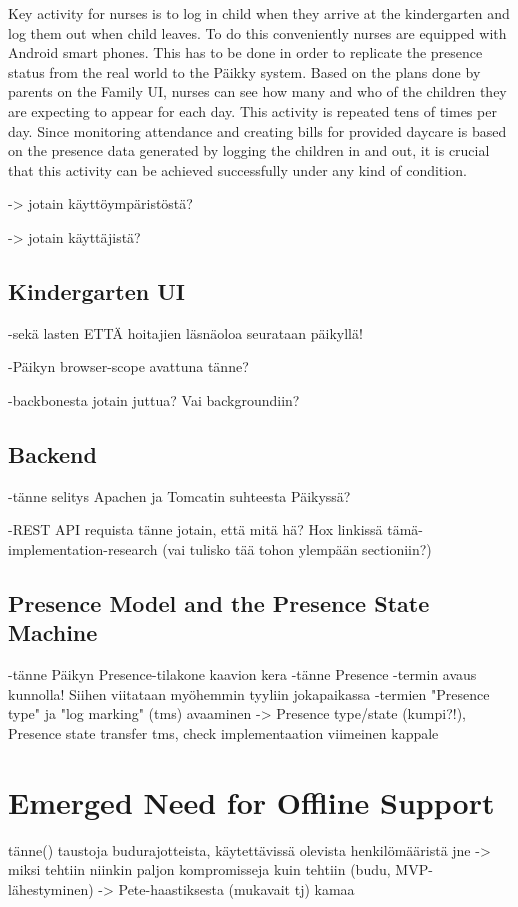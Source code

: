 Key activity for nurses is to log in child when they arrive at the kindergarten and log them out when child leaves. To do this conveniently nurses are equipped with Android smart phones. This has to be done in order to replicate the presence status from the real world to the Päikky system. Based on the plans done by parents on the Family UI, nurses can see how many and who of the children they are expecting to appear for each day. This activity is repeated tens of times per day. Since monitoring attendance and creating bills for provided daycare is based on the presence data generated by logging the children in and out, it is crucial that this activity can be achieved successfully under any kind of condition.

-> jotain käyttöympäristöstä?

-> jotain käyttäjistä?

\subsection{Kindergarten UI}
-sekä lasten ETTÄ hoitajien läsnäoloa seurataan päikyllä!

-Päikyn browser-scope avattuna tänne?

-backbonesta jotain juttua? Vai backgroundiin?




\subsection{Backend}
-tänne selitys Apachen ja Tomcatin suhteesta Päikyssä?

-REST API requista tänne jotain, että mitä hä? Hox linkissä tämä-implementation-research (vai tulisko tää tohon ylempään sectioniin?)




\subsection{Presence Model and the Presence State Machine}
-tänne Päikyn Presence-tilakone kaavion kera
-tänne Presence -termin avaus kunnolla! Siihen viitataan myöhemmin tyyliin jokapaikassa
-termien "Presence type" ja "log marking" (tms) avaaminen
-> Presence type/state (kumpi?!), Presence state transfer tms, check implementaation viimeinen kappale




\section{Emerged Need for Offline Support}
tänne() taustoja budurajotteista, käytettävissä olevista henkilömääristä jne 
-> miksi tehtiin niinkin paljon kompromisseja kuin tehtiin (budu, MVP-lähestyminen)
-> Pete-haastiksesta (mukavait tj) kamaa

